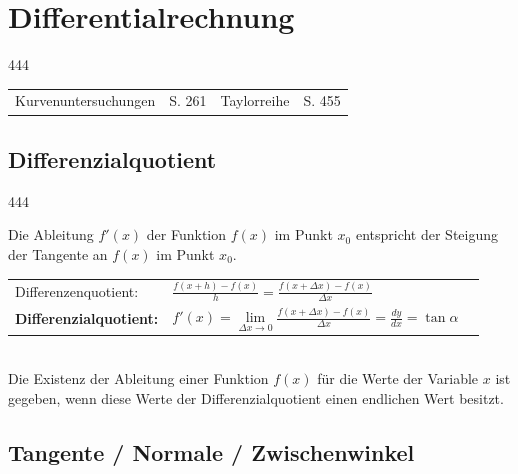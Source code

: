 \section{Differentialrechnung}{444}

\begin{tabular}{ll | ll} 
    Kurvenuntersuchungen & S. 261 & Taylorreihe & S. 455 
\end{tabular}

\subsection{Differenzialquotient}{444}

Die Ableitung $f'(x)$ der Funktion $f(x)$ im Punkt $x_0$ entspricht der Steigung der Tangente an $f(x)$ im Punkt $x_0$.

\begin{tabular}{lll}
Differenzenquotient: 
& $ \displaystyle \frac{f(x + h) - f(x)}{h} = \frac{f(x + \Delta x) - f(x)}{\Delta x} $ & \\[1em]

\textbf{Differenzialquotient:} 
& $ \displaystyle f'(x) = \lim\limits_{\Delta x \to 0} \frac{f(x + \Delta x) - f(x)}{\Delta x} = \frac{dy}{dx} = \tan \alpha$
\end{tabular}\\

Die Existenz der Ableitung einer Funktion $f(x)$ für die Werte der Variable $x$ ist gegeben, wenn diese Werte  der Differenzialquotient einen endlichen Wert besitzt.

\subsection{Tangente / Normale / Zwischenwinkel}

